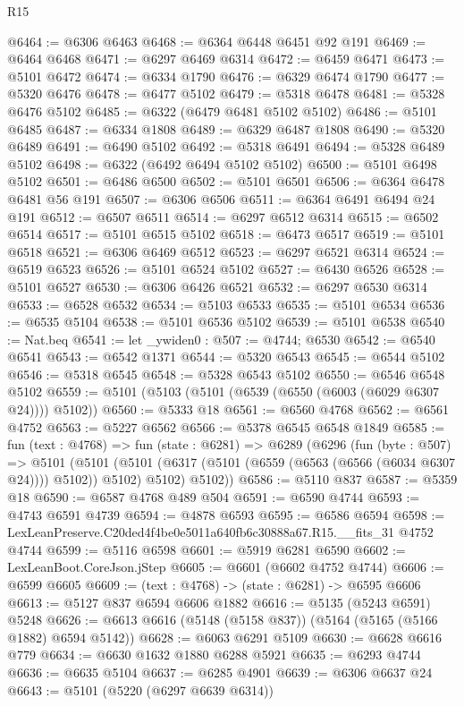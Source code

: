 \begin{lexlean}{R15}
\begin{coremodule}
{{{{{{{{{{{@6464 := @6306 @6463
@6468 := @6364 @6448 @6451 @92 @191
@6469 := @6464 @6468
@6471 := @6297 @6469 @6314
@6472 := @6459 @6471
@6473 := @5101 @6472
@6474 := @6334 @1790
@6476 := @6329 @6474 @1790
@6477 := @5320 @6476
@6478 := @6477 @5102
@6479 := @5318 @6478
@6481 := @5328 @6476 @5102
@6485 := @6322 (@6479 @6481 @5102 @5102)
@6486 := @5101 @6485
@6487 := @6334 @1808
@6489 := @6329 @6487 @1808
@6490 := @5320 @6489
@6491 := @6490 @5102
@6492 := @5318 @6491
@6494 := @5328 @6489 @5102
@6498 := @6322 (@6492 @6494 @5102 @5102)
@6500 := @5101 @6498 @5102
@6501 := @6486 @6500
@6502 := @5101 @6501
@6506 := @6364 @6478 @6481 @56 @191
@6507 := @6306 @6506
@6511 := @6364 @6491 @6494 @24 @191
@6512 := @6507 @6511
@6514 := @6297 @6512 @6314
@6515 := @6502 @6514
@6517 := @5101 @6515 @5102
@6518 := @6473 @6517
@6519 := @5101 @6518
@6521 := @6306 @6469 @6512
@6523 := @6297 @6521 @6314
@6524 := @6519 @6523
@6526 := @5101 @6524 @5102
@6527 := @6430 @6526
@6528 := @5101 @6527
@6530 := @6306 @6426 @6521
@6532 := @6297 @6530 @6314
@6533 := @6528 @6532
@6534 := @5103 @6533
@6535 := @5101 @6534
@6536 := @6535 @5104
@6538 := @5101 @6536 @5102
@6539 := @5101 @6538
@6540 := Nat.beq
@6541 := let _ywiden0 : @507 := @4744; @6530
@6542 := @6540 @6541
@6543 := @6542 @1371
@6544 := @5320 @6543
@6545 := @6544 @5102
@6546 := @5318 @6545
@6548 := @5328 @6543 @5102
@6550 := @6546 @6548 @5102
@6559 := @5101 (@5103 (@5101 (@6539 (@6550 (@6003 (@6029 @6307 @24)))) @5102))
@6560 := @5333 @18
@6561 := @6560 @4768
@6562 := @6561 @4752
@6563 := @5227 @6562
@6566 := @5378 @6545 @6548 @1849
@6585 := fun (text : @4768) =>
  fun (state : @6281) =>
  @6289
    (@6296
      (fun (byte : @507) =>
      @5101
        (@5101 (@5101 (@6317 (@5101 (@6559 (@6563 (@6566 (@6034 @6307 @24)))) @5102)) @5102) @5102)
        @5102))
@6586 := @5110 @837
@6587 := @5359 @18
@6590 := @6587 @4768 @489 @504
@6591 := @6590 @4744
@6593 := @4743 @6591 @4739
@6594 := @4878 @6593
@6595 := @6586 @6594
@6598 := LexLeanPreserve.C20ded4f4be0e5011a640fb6c30888a67.R15.__fits_31 @4752 @4744
@6599 := @5116 @6598
@6601 := @5919 @6281 @6590
@6602 := LexLeanBoot.CoreJson.jStep
@6605 := @6601 (@6602 @4752 @4744)
@6606 := @6599 @6605
@6609 := (text : @4768) -> (state : @6281) -> @6595 @6606
@6613 := @5127 @837 @6594 @6606 @1882
@6616 := @5135 (@5243 @6591) @5248
@6626 := @6613 @6616 (@5148 (@5158 @837)) (@5164 (@5165 (@5166 @1882) @6594 @5142))
@6628 := @6063 @6291 @5109
@6630 := @6628 @6616 @779
@6634 := @6630 @1632 @1880 @6288 @5921
@6635 := @6293 @4744
@6636 := @6635 @5104
@6637 := @6285 @4901
@6639 := @6306 @6637 @24
@6643 := @5101 (@5220 (@6297 @6639 @6314))
}}}}}}}}}}}
\end{coremodule}
\end{lexlean}
